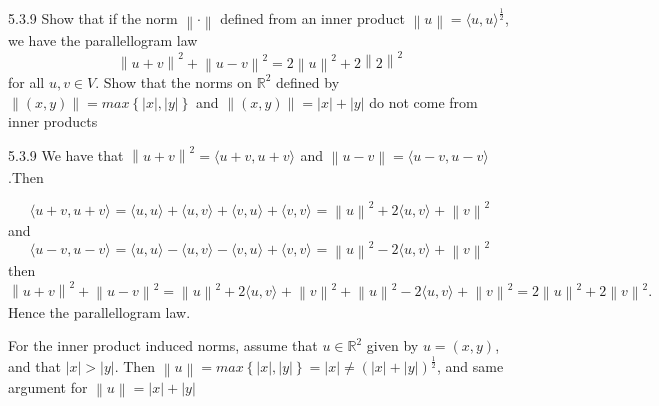 \documentclass[a4paper,norsk]{article}
\begin{document}
\begin{oppgavebox}{5.3.9}{}
Show that if the norm $ \left\lVert \cdot \right\rVert  $ defined from an inner product $ \left\lVert u \right\rVert = \langle u, u \rangle_{  }^{ \frac{ 1 }{ 2 }}  $, we have the parallellogram law
\[
    \left\lVert u+v \right\rVert ^{2} + \left\lVert u-v \right\rVert ^{2} = 2 \left\lVert u \right\rVert ^{2} + 2\left\lVert  2\right\rVert ^{2}    
\]
for all $ u, v \in V $. Show that the norms on $ \mathbb{R}^2 $ defined by $ \left\lVert \left( x, y \right)  \right\rVert = max \left\{ \left| x \right| , \left| y \right|  \right\}   $ and $ \left\lVert \left( x, y \right)  \right\rVert = \left| x \right| + \left| y \right|   $ do not come from inner products

\begin{proofbox}{5.3.9}{}
  We have that $ \left\lVert u+v \right\rVert ^{2} = \langle u+v, u+v \rangle_{  }   $ and $ \left\lVert u-v \right\rVert = \langle u-v, u-v \rangle_{  }  $.Then

  \[
      \langle u+v, u+v \rangle_{  } = \langle u, u \rangle_{  } + \langle u, v \rangle_{  }  + \langle v, u \rangle_{  } + \langle v, v \rangle_{  } = \left\lVert u \right\rVert ^{2} + 2 \langle u, v \rangle_{  }  + \left\lVert v \right\rVert ^{2} 
  \]
  and
  \[
      \langle u-v, u-v \rangle_{  } = \langle u, u \rangle_{  } - \langle u, v \rangle_{  } - \langle v, u \rangle_{  } + \langle v, v \rangle_{  } = \left\lVert u \right\rVert ^{2} - 2 \langle u, v \rangle_{  }  + \left\lVert v \right\rVert ^{2} 
  \]
  then
  \[
      \left\lVert u+v \right\rVert ^{2} + \left\lVert u - v \right\rVert ^{2}   = \left\lVert u \right\rVert ^{2} + 2 \langle u, v \rangle_{  }  + \left\lVert v \right\rVert ^{2} + \left\lVert u \right\rVert ^{2} - 2 \langle u, v \rangle_{  }   + \left\lVert v \right\rVert ^{2} = 2 \left\lVert u \right\rVert ^{2} + 2 \left\lVert v \right\rVert ^{2}.
  \]
  Hence the parallellogram law.
  
  


  For the inner product induced norms, assume that $ u \in \mathbb{R}^2 $ given by $ u = \left( x, y \right)  $, and that $ \left| x \right| > \left| y \right|  $. Then $ \left\lVert u \right\rVert = max \left\{ \left| x \right| , \left| y \right|  \right\} = \left| x \right| \neq \left( \left| x \right| + \left| y \right|  \right) ^{ \frac{ 1 }{ 2 }}   $, and same argument for $ \left\lVert u \right\rVert = \left| x \right| + \left| y \right|  $  
  
\end{proofbox}
\end{oppgavebox}
\end{document}
